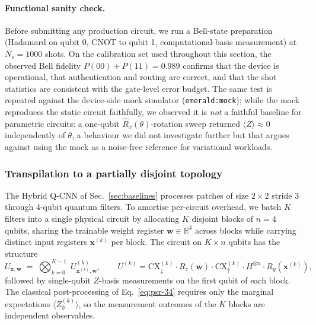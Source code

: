 \paragraph{Functional sanity check.}
Before submitting any production circuit, we run a Bell-state preparation 
(Hadamard on qubit 0, CNOT to qubit 1, computational-basis measurement) 
at $N_s=1000$ shots. On the calibration set used throughout this section, 
the observed Bell fidelity $P(00)+P(11)=0.989$ confirms that the device 
is operational, that authentication and routing are correct, and that the 
shot statistics are consistent with the gate-level error budget. The same 
test is repeated against the device-side mock simulator (\texttt{emerald:mock}); 
while the mock reproduces the static circuit faithfully, we observed it is 
\emph{not} a faithful baseline for parametric circuits: a one-qubit 
$\hat R_x(\theta)$-rotation sweep returned $\langle Z\rangle\!\approx\!0$ 
independently of $\theta$, a behaviour we did not investigate further but 
that argues against using the mock as a noise-free reference for variational 
workloads.

\subsubsection{Transpilation to a partially disjoint topology}
\label{subsec:transpilation}

The Hybrid Q-CNN of Sec.~\ref{sec:baselines} processes patches of size $2\times 2$ stride 3 through 4-qubit quantum filters. To amortise per-circuit overhead, we batch $K$ filters into a single physical circuit by allocating $K$ disjoint blocks of $n=4$ qubits, sharing the trainable weight register $\boldsymbol{w}\in\mathbb{R}^{4}$ across blocks while carrying distinct input registers $\boldsymbol{x}^{(k)}$ per block. The circuit on $K\times n$ qubits has the structure
\begin{equation}
U_{\boldsymbol{x},\boldsymbol{w}}
\;=\;
\bigotimes_{k=0}^{K-1}\;
U^{(k)}_{\boldsymbol{x}^{(k)}\!,\boldsymbol{w}},
\qquad
U^{(k)} = \mathrm{CX}_{\downarrow}^{(k)} \cdot R_z(\boldsymbol{w}) \cdot \mathrm{CX}_{\uparrow}^{(k)} \cdot H^{\otimes n} \cdot R_y(\boldsymbol{x}^{(k)}),
\label{eq:parallel_circuit}
\end{equation}
followed by single-qubit $Z$-basis measurements on the first qubit of each block. The classical post-processing of Eq.~\ref{eq:psr-34} requires only the marginal expectations $\langle Z_0^{(k)}\rangle$, so the measurement outcomes of the $K$ blocks are independent observables.

